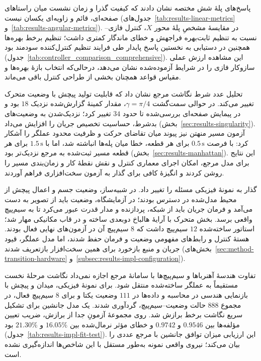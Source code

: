 پاسخ‌های پلهٔ شش مختصه نشان دادند که کیفیت گذرا و زمان نشست میان راستاهای صفحه‌ای، قائم و زاویه‌ای یکسان نیست (جدول‌های~\ref{tab:results-linear-metrics} و~\ref{tab:results-angular-metrics}). در مقایسهٔ مشخصِ پلهٔ محور \(X\)، کنترل فازی-- نسبت به تنظیم  ثابت‌بهره فراجهش و خطای ماندگار کمتری داشت؛ تنظیم برخط بهره‌ها همچنین در دستیابی به نخستین پاسخ پایدار طی فرایند تنظیم کنترل‌کننده سودمند بود (جدول~\ref{tab:controller_comparison_comprehensive}). این مشاهده ارزش عملی سازوکار فازی را در شرایط آزموده‌شده نشان می‌دهد، درحالی‌که انتخاب بازهٔ بهره‌ها و مقیاس قواعد همچنان بخشی از طراحی کنترل باقی می‌ماند.

تحلیل عدد شرط نگاشت مرجع نشان داد که قابلیت تولید پیچش با وضعیت متحرک تغییر می‌کند. در حوالی سمت‌گشت \(\gamma=\pi/4\)، مقدار کمینهٔ گزارش‌شده نزدیک \(18\) بود و در پیمایش صفحه‌ای بررسی‌شده تا حدود \(34\) تغییر کرد؛ نزدیک‌شدن به وضعیت‌های بدشرط، حساسیت تخصیص جریان را افزایش می‌داد (بخش~\ref{sec:results-singularity}). آزمون مسیر منهتن نیز پیوند میان تقاضای حرکت و ظرفیت محدود عملگر را آشکار کرد: با فرصت \(0.5\,\mathrm{s}\) برای هر قطعه، خطا میان پله‌ها انباشته شد، اما با \(1.5\,\mathrm{s}\) برای هر قطعه مسیر ثبت‌شده به مرجع نزدیک‌تر بود (بخش~\ref{sec:results-manhattan}). این نتایج برای مدل مرجع، امکان اجرای معماری کنترل و نقش نقطهٔ کار و زمان‌بندی مسیر را روشن کردند و انگیزهٔ کافی برای گذار به آزمون سخت‌افزاری فراهم آوردند.

گذار به نمونهٔ فیزیکی مسئله را تغییر داد. در شبیه‌ساز، وضعیت جسم و اعمال پیچش از محیط مدل‌شده در دسترس بودند؛ در آزمایشگاه، وضعیت باید از تصویر به دست می‌آمد و فرمان جریان باید از شبکه، پردازنده و مدار قدرت عبور می‌کرد تا به سیم‌پیچ واقعی برسد. بخش متحرک با آرایهٔ هالباخ دوبعدی ساخته و در قاب مکانیکی مهار شد؛ استاتور ساخته‌شده \(12\) سیم‌پیچ داشت که \(8\) سیم‌پیچ آن در آزمون‌های نهایی فعال بودند. هستهٔ کنترل و رابط‌های مفهومی وضعیت و فرمان حفظ شدند، اما مدل عملگر، قیود جریان و منبع بازخورد برای همین سخت‌افزار بازتعریف شدند (بخش‌های~\ref{sec:method-transition-hardware} و~\ref{subsec:results-impl-configuration}).

تفاوت هندسهٔ آهنرباها و سیم‌پیچ‌ها با سامانهٔ مرجع اجازه نمی‌داد نگاشت مرحلهٔ نخست مستقیماً به عملگر ساخته‌شده منتقل شود. برای نمونهٔ فیزیکی، میدان و پیچش با بازنمایی هندسی در  محاسبه و داده‌ها در \(111\) وضعیت یکتا و برای \(8\) سیم‌پیچ فعال، در مجموع \(888\) حالت وضعیت--سیم‌پیچ، گردآوری شدند. یک مدل جانشین برای تشکیل سریع نگاشت برخط برازش شد. روی مجموعهٔ آزمونِ جدا از برازش، ضریب تعیین مؤلفه‌ها بین \(0.9546\) و \(0.9742\) و خطای مؤثر نرمال‌شده بین \(16.05\%\) و \(21.30\%\) بود (جدول~\ref{tab:results-impl-fit-test}). این ارزیابی میزان توافق جانشین با مرجع عددی را بیان می‌کند؛ نیروی واقعی نمونه به‌طور مستقل با این شاخص‌ها اندازه‌گیری نشده است.

